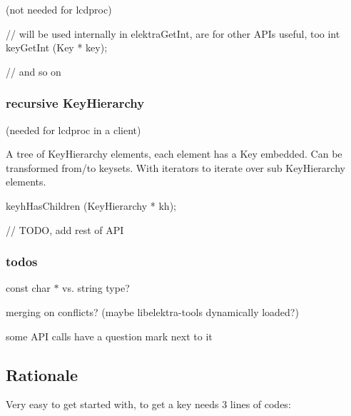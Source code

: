 (not needed for lcdproc)


\begin{DoxyCode}
\textcolor{comment}{// will be used internally in elektraGetInt, are for other APIs useful, too}
\textcolor{keywordtype}{int} keyGetInt (Key * key);

\textcolor{comment}{// and so on}
\end{DoxyCode}


\subsubsection*{recursive Key\+Hierarchy}

(needed for lcdproc in a client)

A tree of {\ttfamily Key\+Hierarchy} elements, each element has a {\ttfamily Key} embedded. Can be transformed from/to keysets. With iterators to iterate over sub {\ttfamily Key\+Hierarchy} elements.


\begin{DoxyCode}
keyhHasChildren (KeyHierarchy * kh);

\textcolor{comment}{// TODO, add rest of API}
\end{DoxyCode}


\subsubsection*{todos}


\begin{DoxyItemize}
\item const char $\ast$ vs. string type?
\item merging on conflicts? (maybe libelektra-\/tools dynamically loaded?)
\item some A\+PI calls have a question mark next to it
\end{DoxyItemize}

\subsection*{Rationale}


\begin{DoxyEnumerate}
\item Very easy to get started with, to get a key needs 3 lines of codes\+:
\end{DoxyEnumerate}





